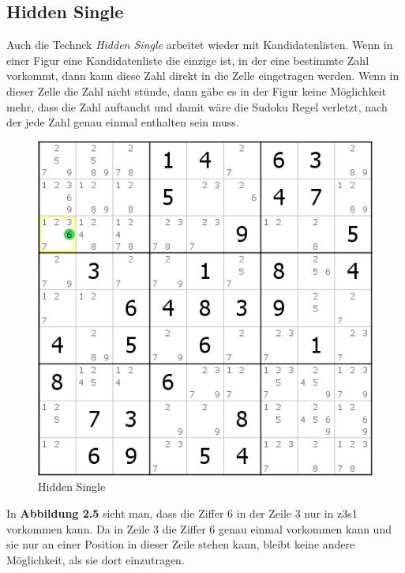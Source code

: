 \newpage
\subsection{Hidden Single}
\label{Hidden Single}
Auch die Technck \textit{Hidden Single} arbeitet wieder mit Kandidatenlisten. Wenn in einer Figur eine Kandidatenliste die einzige ist, in der eine bestimmte Zahl vorkommt, dann kann diese Zahl direkt in die Zelle eingetragen werden. Wenn in dieser Zelle die Zahl nicht stünde, dann gäbe es in der Figur keine Möglichkeit mehr, dass die Zahl auftaucht und damit wäre die Sudoku Regel verletzt, nach der jede Zahl genau einmal enthalten sein muss.

\begin{figure}[h]
\begin{center}
\includegraphics{./img/hidden_single.png}
\caption{Hidden Single}
\end{center}
\end{figure}

In \textbf{Abbildung 2.5} sieht man, dass die Ziffer 6 in der Zeile 3 nur in z3s1 vorkommen kann. Da in Zeile 3 die Ziffer 6 genau einmal vorkommen kann und sie nur an einer Position in dieser Zeile stehen kann, bleibt keine andere Möglichkeit, als sie dort einzutragen.
